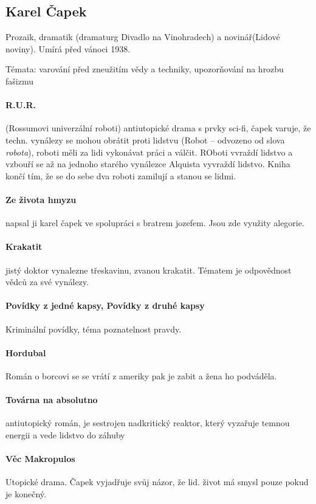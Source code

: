 \documentclass[10pt,a4page,headings,openany,%
oneside
,twocolumn
]{report}
\begin{document}
\subsection{Karel Čapek}
Prozaik, dramatik (dramaturg Divadlo na Vinohradech) a novinář(Lidové noviny). Umírá před vánoci 1938. 

Témata: \textsf{varování před zneužitím vědy a techniky, upozorňování na hrozbu fašizmu}
\paragraph{R.U.R.}(Rossumovi univerzální roboti) antiutopické drama s prvky sci-fi, čapek varuje, že techn. vynálezy se mohou obrátit proti lidstvu (Robot -- odvozeno od slova \emph{robota}), roboti měli za lidi vykonávat práci a válčit. ROboti vvraždí lidstvo a vzbouří se až na jednoho starého vynálezce Alquista vyvraždí lidstvo. Kniha končí tím, že se do sebe dva roboti zamilují a stanou se lidmi.

\paragraph{Ze života hmyzu} napsal ji karel čapek ve spolupráci s bratrem jozefem. Jsou zde využity alegorie.

\paragraph{Krakatit} jistý doktor vynalezne třeskavinu, zvanou krakatit. Tématem je odpovědnost vědců za své vynálezy.

\paragraph{Povídky z jedné kapsy, Povídky z druhé kapsy} Kriminální povídky, téma poznatelnost pravdy.

\paragraph{Hordubal} Román o borcovi se se vrátí z ameriky pak  je zabit a žena ho podváděla.

\paragraph{Továrna na absolutno} antiutopický román, je sestrojen nadkritický reaktor, který vyzařuje temnou energii a vede lidstvo do záhuby

\paragraph{Věc Makropulos} Utopické drama. 
Čapek vyjadřuje svůj názor, že lid. život má smysl pouze pokud je konečný.
\end{document}
